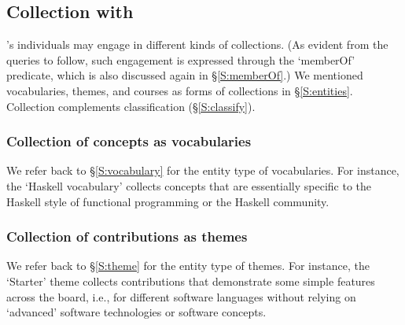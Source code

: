 




\subsection{Collection with \solasote}
\label{S:collect}

\solasote's individuals may engage in different kinds of collections. (As evident from the queries to follow, such engagement is expressed through the `memberOf' predicate, which is also discussed again in \S\ref{S:memberOf}.) We mentioned vocabularies, themes, and courses as forms of collections in \S\ref{S:entities}. Collection complements classification (\S\ref{S:classify}).


\subsubsection{Collection of concepts as vocabularies}

We refer back to \S\ref{S:vocabulary} for the entity type of vocabularies. For instance, the `Haskell vocabulary' collects concepts that are essentially specific to the Haskell style of functional programming or the Haskell community.




\subsubsection{Collection of contributions as themes}

We refer back to \S\ref{S:theme} for the entity type of themes. For instance, the `Starter' theme collects contributions that demonstrate some simple features across the board, i.e., for different software languages without relying on `advanced' software technologies or software concepts.

